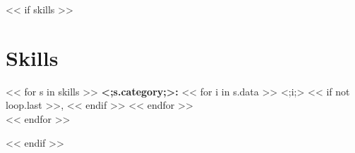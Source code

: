 \documentclass[letterpaper,11pt]{article}
\begin{document}
%

<< if skills >>
\section{Skills}
 \begin{itemize}[leftmargin=0.15in, label={}]
    \small{\item{
    << for s in skills >>
     \textbf{<;s.category;>:}{
         << for i in s.data >>
         <;i;>
         << if not loop.last >>, << endif >>
         << endfor >>
     } \\
    << endfor >>
    }}
 \end{itemize}
<< endif >>


\end{document}
